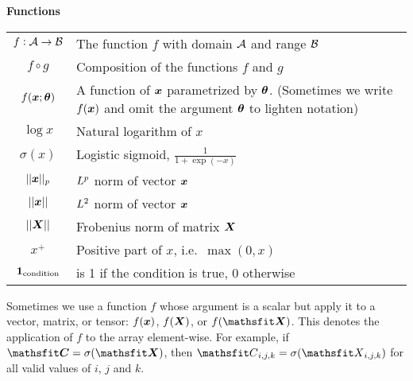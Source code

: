 \vspace{\notationgap}
\begin{minipage}{\textwidth}
	\centerline{\bf Functions}
	\bgroup
	\def\arraystretch{1.5}
	\begin{tabular}{cp{3.25in}}
		$\displaystyle f: {\mathcal{A}} \rightarrow {\mathcal{B}}$ & The function $f$ with domain ${\mathcal{A}}$ and range ${\mathcal{B}}$\\
		$\displaystyle f \circ g $ & Composition of the functions $f$ and $g$ \\
		$\displaystyle f({\bm{x}} ; {\bm{\theta}}) $ & A function of ${\bm{x}}$ parametrized by ${\bm{\theta}}$.
		(Sometimes we write $f({\bm{x}})$ and omit the argument ${\bm{\theta}}$ to lighten notation) \\
		$\displaystyle \log x$ & Natural logarithm of $x$ \\
		$\displaystyle \sigma(x)$ & Logistic sigmoid, $\displaystyle \frac{1} {1 + \exp(-x)}$ \\
		$\displaystyle || {\bm{x}} ||_p $ & $L^p$ norm of vector ${\bm{x}}$ \\
		$\displaystyle || {\bm{x}} || $ & $L^2$ norm of vector ${\bm{x}}$ \\
        $\displaystyle || {\bm{X}} || $ & Frobenius norm of matrix ${\bm{X}}$ \\
		$\displaystyle x^+$ & Positive part of $x$, i.e.\ $\max(0,x)$\\
		$\displaystyle \bm{1}_\mathrm{condition}$ & is 1 if the condition is true, 0 otherwise\\
	\end{tabular}
	\egroup
\end{minipage}

Sometimes we use a function $f$ whose argument is a scalar but apply
it to a vector, matrix, or tensor: $f({\bm{x}})$, $f({\bm{X}})$, or $f(\tX)$.
This denotes the application of $f$ to the
array element-wise. For example, if $\tC = \sigma(\tX)$, then $\etC_{i,j,k} = \sigma(\etX_{i,j,k})$
for all valid values of $i$, $j$ and $k$.

